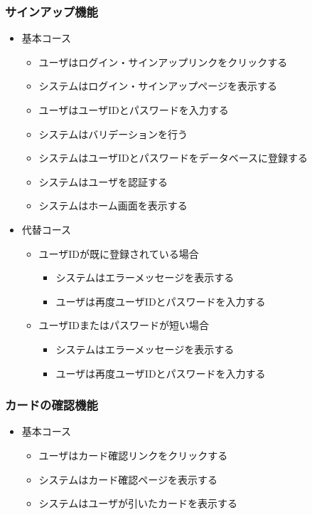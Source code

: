 \documentclass{ltjsarticle}
\begin{document}
\subsubsection{サインアップ機能}
\begin{itemize}
  \item 基本コース
  \begin{itemize}
    \item ユーザはログイン・サインアップリンクをクリックする
    \item システムはログイン・サインアップページを表示する
    \item ユーザはユーザIDとパスワードを入力する
    \item システムはバリデーションを行う
    \item システムはユーザIDとパスワードをデータベースに登録する
    \item システムはユーザを認証する
    \item システムはホーム画面を表示する
  \end{itemize}
  \item 代替コース
  \begin{itemize}
    \item ユーザIDが既に登録されている場合
    \begin{itemize}
      \item システムはエラーメッセージを表示する
      \item ユーザは再度ユーザIDとパスワードを入力する
    \end{itemize}
    \item ユーザIDまたはパスワードが短い場合
    \begin{itemize}
      \item システムはエラーメッセージを表示する
      \item ユーザは再度ユーザIDとパスワードを入力する
    \end{itemize}
  \end{itemize}
\end{itemize}

\subsubsection{カードの確認機能}
\begin{itemize}
  \item 基本コース
  \begin{itemize}
    \item ユーザはカード確認リンクをクリックする
    \item システムはカード確認ページを表示する
    \item システムはユーザが引いたカードを表示する
  \end{itemize}
\end{itemize}
\end{document}
